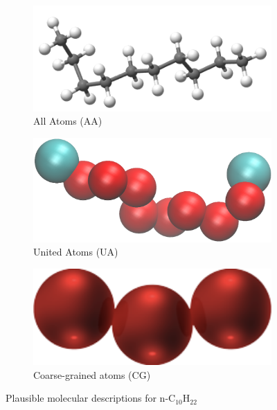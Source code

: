 \documentclass[9pt,bestpractices]{livecoms}
\begin{document}
\begin{figure}
	\centering
	\begin{subfigure}{0.27\textwidth} %
    \includegraphics[width=1\textwidth]{gfx/image26.png}
		\caption{All Atoms (AA)} %
	\end{subfigure}
	\begin{subfigure}{0.27\textwidth} %
    \includegraphics[width=1\textwidth]{gfx/image27-tiff.png}
		\caption{United Atoms (UA)} %
	\end{subfigure}
	\begin{subfigure}{0.27\textwidth} %
    \includegraphics[width=1\textwidth]{gfx/image28.png}
		\caption{Coarse-grained atoms (CG)} %
	\end{subfigure}
  \caption{Plausible molecular descriptions for n-C$_{10}$H$_{22}$}
  \label{fig:9b}
\end{figure}
\end{document}
